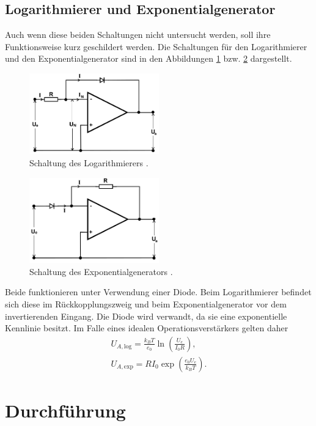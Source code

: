 \subsection{Logarithmierer und Exponentialgenerator}
Auch wenn diese beiden Schaltungen nicht untersucht werden, soll ihre
Funktionsweise kurz geschildert werden. Die Schaltungen für den 
Logarithmierer und den Exponentialgenerator sind in den Abbildungen
\ref{pic:log} bzw. \ref{pic:exp} dargestellt.
\begin{figure}[t]
 \includegraphics[width = 0.5\textwidth]{../pics/log.png}
 \caption{Schaltung des Logarithmierers \cite{Anl}.}
 \label{pic:log}
\end{figure}
\begin{figure}[t]
 \includegraphics[width = 0.5\textwidth]{../pics/exp.png}
 \caption{Schaltung des Exponentialgenerators \cite{Anl}.}
 \label{pic:exp}
\end{figure}
Beide funktionieren unter Verwendung einer Diode. Beim Logarithmierer
befindet sich diese im Rückkopplungszweig und beim Exponentialgenerator
vor dem invertierenden Eingang. Die Diode wird verwandt, da sie eine
exponentielle Kennlinie besitzt. Im Falle eines idealen Operationsverstärkers
gelten daher
\begin{align}
 U_{A,\text{log}} = \frac{k_BT}{e_0} \ln\left(\frac{U_e}{I_0 R}\right),\\
 U_{A,\text{exp}} = RI_0\exp\left(\frac{e_0U_e}{k_BT}\right).
\end{align}



\section{Durchführung}
